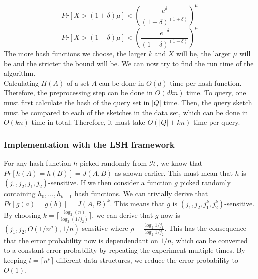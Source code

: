 $$Pr[X > (1+\delta)\mu] < \left(\frac{e^\delta}{(1+\delta)^{(1+\delta)}}\right)^\mu$$
$$Pr[X > (1-\delta)\mu] < \left(\frac{e^{-\delta}}{(1-\delta)^{(1-\delta)}}\right)^\mu$$
The more hash functions we choose, the larger $k$ and $X$ will be, the larger $\mu$ will be and the stricter the bound will be. We can now try to find the run time of the algorithm.\\
Calculating $H(A)$ of a set $A$ can be done in $O(d)$ time per hash function. Therefore, the preprocessing step can be done in $O(dkn)$ time. To query, one must first calculate the hash of the query set in $|Q|$ time. Then, the query sketch must be compared to each of the sketches in the data set, which can be done in $O(kn)$ time in total. Therefore, it must take $O(|Q| + kn)$ time per query.

\subsubsection{Implementation with the LSH framework}
For any hash function $h$ picked randomly from $\mathcal{H}$, we know that $Pr[h(A)=h(B)]=J(A,B)$ as shown earlier. This must mean that $h$ is $(j_1, j_2, j_1, j_2)$-sensitive. If we then consider a function $g$ picked randomly containing $h_0, \dots, h_{k-1}$ hash functions. We can trivially derive that $Pr[g(a)=g(b)]=J(A,B)^k$. This means that $g$ is $(j_1, j_2, j_1^k, j_2^k)$-sensitive. By choosing $k=\lceil \frac{\log_2(n)}{\log_2(1/j_2)} \rceil$, we can derive that $g$ now is $(j_1, j_2, O(1/n^\rho), 1/n)$-sensitive where $\rho=\frac{\log_2{1/j_1}}{\log_2{1/j_2}}$. %
This has the consequence that the error probability now is dependendant on $1/n$, which can be converted to a constant error probability by repeating the experiment multiple times. By keeping $l=\lceil n^\rho \rceil$ different data structures, we reduce the error probability to $O(1)$.\\
